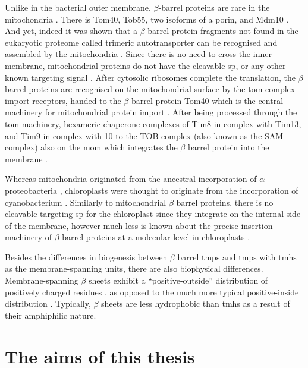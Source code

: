 Unlike in the bacterial outer membrane, $\beta$-barrel proteins are rare in the mitochondria \cite{Ulrich2015}.
There is Tom40, Tob55, two isoforms of a porin, and Mdm10 \cite{Ulrich2015}.
And yet, indeed it was shown that a $\beta$ barrel protein fragments not found in the eukaryotic proteome called trimeric autotransporter can be recognised and assembled by the mitochondria \cite{Muller2011}.
Since there is no need to cross the inner membrane, mitochondrial proteins do not have the cleavable \gls{sp}, or any other known targeting signal \cite{Ulrich2015}.
After cytosolic ribosomes complete the translation, the $\beta$ barrel proteins are recognised on the mitochondrial surface by the \gls{tom} complex import receptors, handed to the $\beta$ barrel protein Tom40 which is the central machinery for mitochondrial protein import \cite{Chacinska2009}.
After being processed through the \gls{tom} machinery, hexameric chaperone complexes of Tim8 in complex with Tim13, and Tim9 in complex with 10 to the TOB complex (also known as the SAM complex) also on the \gls{mom} which integrates the $\beta$ barrel protein into the membrane \cite{Wiedemann2003, Paschen2003, Gentle2004}.

Whereas mitochondria originated from the ancestral incorporation of $\alpha$\--proteobacteria \cite{Gray1999}, chloroplasts were thought to originate from the incorporation of cyanobacterium \cite{McFadden2001}.
Similarly to mitochondrial $\beta$ barrel proteins, there is no cleavable targeting \gls{sp} for the chloroplast since they integrate on the internal side of the membrane, however much less is known about the precise insertion machinery of $\beta$ barrel proteins at a molecular level in chloroplasts \cite{Ulrich2015}.

Besides the differences in biogenesis between $\beta$ barrel \gls{tmp}s and \gls{tmp}s with \gls{tmh}s as the membrane\--spanning units, there are also biophysical differences.
Membrane\--spanning $\beta$ sheets exhibit a ``positive\--outside'' distribution of positively charged residues \cite{Pogozheva2013}, as opposed to the much more typical positive\--inside distribution \cite{VonHeijne1989, Andersson1992, Pogozheva2013, Sharpe2010, Baeza-Delgado2013}.
Typically, $\beta$ sheets are less hydrophobic than \gls{tmh}s \cite{Tamm2004} as a result of their amphiphilic nature.

\section{The aims of this thesis}

